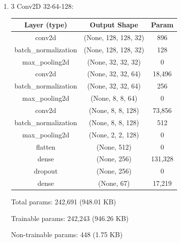 \documentclass{article}
\begin{document}
\begin{enumerate}
        
            \item 3 Conv2D 32-64-128:
                \begin{table}[h!]
                    \centering
                    \begin{tabular}{| c | c | c |}
                        \hline
                        Layer (type) & Output Shape & Param \\
                        \hline
                        conv2d & (None, 128, 128, 32) & 896 \\
                        \hline
                        batch\_normalization & (None, 128, 128, 32) & 128 \\
                        \hline
                        max\_pooling2d & (None, 32, 32, 32) & 0 \\
                        \hline
                        conv2d & (None, 32, 32, 64) & 18,496 \\
                        \hline
                        batch\_normalization & (None, 32, 32, 64) & 256 \\
                        \hline
                        max\_pooling2d & (None, 8, 8, 64) & 0 \\
                        \hline
                        conv2d & (None, 8, 8, 128) & 73,856 \\
                        \hline
                        batch\_normalization & (None, 8, 8, 128) & 512 \\
                        \hline
                        max\_pooling2d & (None, 2, 2, 128) & 0 \\
                        \hline
                        flatten & (None, 512) & 0 \\
                        \hline
                        dense & (None, 256) & 131,328 \\
                        \hline
                        dropout & (None, 256) & 0 \\
                        \hline
                        dense & (None, 67) & 17,219 \\
                        \hline
                    \end{tabular}
                \end{table}

                Total params: 242,691 (948.01 KB)

                Trainable params: 242,243 (946.26 KB)

                Non-trainable params: 448 (1.75 KB)


\end{enumerate}
\end{document}
